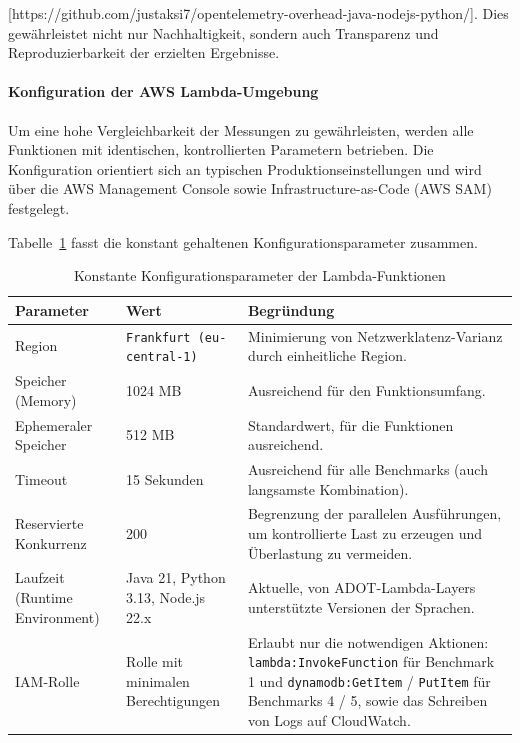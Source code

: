 [https://github.com/justaksi7/opentelemetry-overhead-java-nodejs-python/]. Dies gewährleistet nicht nur Nachhaltigkeit, 
sondern auch Transparenz und Reproduzierbarkeit der erzielten Ergebnisse.

\paragraph{Konfiguration der AWS Lambda-Umgebung}
Um eine hohe Vergleichbarkeit der Messungen zu gewährleisten, werden alle Funktionen mit identischen, kontrollierten 
Parametern betrieben. Die Konfiguration orientiert sich an typischen Produktionseinstellungen und wird über die AWS Management Console 
sowie Infrastructure-as-Code (AWS SAM) festgelegt.

Tabelle~\ref{tab:konfiguration} fasst die konstant gehaltenen Konfigurationsparameter zusammen.

\begin{table}[H]
\centering
\caption{Konstante Konfigurationsparameter der Lambda-Funktionen}
\label{tab:konfiguration}
\begin{tabular}{|p{3cm}|p{3cm}|p{5.5cm}|}
\hline
\textbf{Parameter} & \textbf{Wert} & \textbf{Begründung} \\
\hline
Region & \texttt{Frankfurt (eu-central-1)} & Minimierung von Netzwerklatenz-Varianz durch einheitliche Region. \\
\hline
Speicher (Memory) & 1024 MB & Ausreichend für den Funktionsumfang. \\
\hline
Ephemeraler Speicher & 512 MB & Standardwert, für die Funktionen ausreichend. \\
\hline
Timeout & 15 Sekunden & Ausreichend für alle Benchmarks (auch langsamste Kombination). \\
\hline
Reservierte Konkurrenz & 200 & Begrenzung der parallelen Ausführungen, um kontrollierte Last zu erzeugen und Überlastung zu vermeiden. \\
\hline
Laufzeit (Runtime Environment) & Java 21, Python 3.13, Node.js 22.x & Aktuelle, von \ac{ADOT}-Lambda-Layers unterstützte Versionen der Sprachen. \\
\hline
IAM-Rolle & Rolle mit minimalen Berechtigungen & Erlaubt nur die notwendigen Aktionen: \texttt{lambda:InvokeFunction} für Benchmark 1 
und \texttt{dynamodb:GetItem} / \texttt{PutItem} für Benchmarks 4 / 5, sowie das Schreiben von Logs auf CloudWatch. \\
\hline
\end{tabular}
\end{table}

